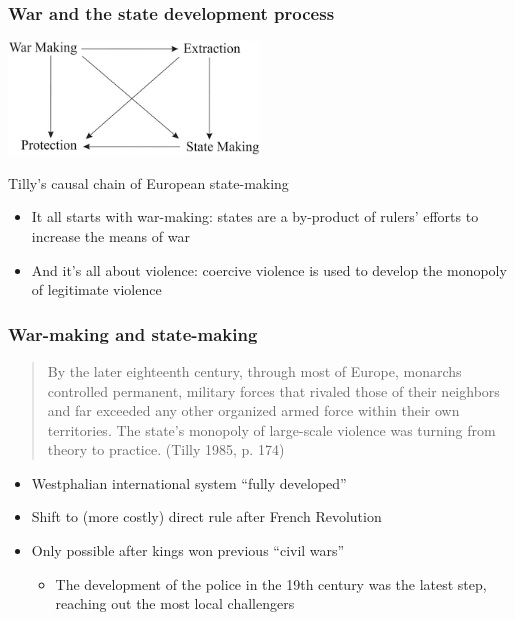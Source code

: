 \documentclass[aspectratio=43]{beamer}
\begin{document}
\begin{frame}
\frametitle{War and the state development process}
\centering

\includegraphics[width = 0.5\textwidth]{img/tilly_causal_chain}

\vspace{20pt}

{\small Tilly's causal chain of European state-making}

\vspace{20pt}

\begin{itemize}
  \item It all starts with war-making: states are a by-product of rulers' efforts to increase the means of war
  \item And it's all about violence: coercive violence is used to develop the monopoly of legitimate violence
\end{itemize}

\end{frame}

\begin{frame}
\frametitle{War-making and state-making}
\centering

\begin{quote}
  By the later eighteenth century, through most of Europe, monarchs controlled permanent, military forces that rivaled those of their neighbors and far exceeded any other organized armed force within their own territories. The state's monopoly of large-scale violence was turning from theory to practice. (Tilly 1985, p. 174)
\end{quote}

\begin{itemize}
\item Westphalian international system ``fully developed''
\item<2-> Shift to (more costly) direct rule after French Revolution
\item<2-> Only possible after kings won previous ``civil wars''
  \begin{itemize}
    \item The development of the police in the 19th century was the latest step, reaching out the most local challengers
  \end{itemize}
\end{itemize}

\end{frame}
\end{document}

